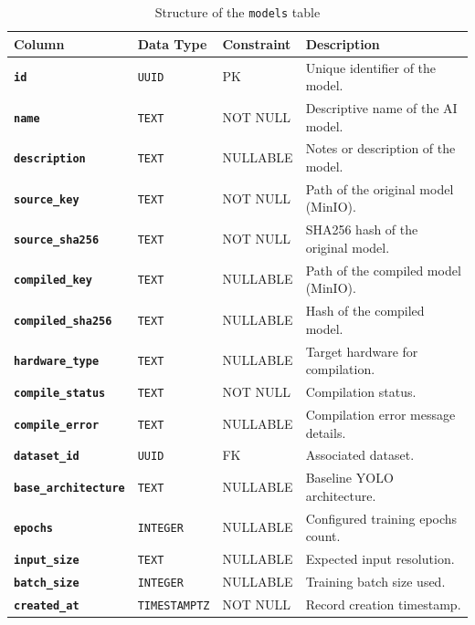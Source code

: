 \begin{table}[H]
    \centering
    \caption{Structure of the \texttt{models} table}
    \label{tab:models}
    \begin{tabular}{p{}
                    p{}
                    p{}
                    p{}}
        \hline
        \textbf{Column} & \textbf{Data Type} & \textbf{Constraint} & \textbf{Description} \\
        \hline
        \textbf{\texttt{id}} & \texttt{UUID} & \gls{PK} & Unique identifier of the model. \\
        \textbf{\texttt{name}} & \texttt{TEXT} & NOT NULL & Descriptive name of the AI model. \\
        \textbf{\texttt{description}} & \texttt{TEXT} & NULLABLE & Notes or description of the model. \\
        \textbf{\texttt{source\_key}} & \texttt{TEXT} & NOT NULL & Path of the original model (MinIO). \\
        \textbf{\texttt{source\_sha256}} & \texttt{TEXT} & NOT NULL & SHA256 hash of the original model. \\
        \textbf{\texttt{compiled\_key}} & \texttt{TEXT} & NULLABLE & Path of the compiled model (MinIO). \\
        \textbf{\texttt{compiled\_sha256}} & \texttt{TEXT} & NULLABLE & Hash of the compiled model. \\
        \textbf{\texttt{hardware\_type}} & \texttt{TEXT} & NULLABLE & Target hardware for compilation. \\
        \textbf{\texttt{compile\_status}} & \texttt{TEXT} & NOT NULL & Compilation status. \\
        \textbf{\texttt{compile\_error}} & \texttt{TEXT} & NULLABLE & Compilation error message details. \\
        \textbf{\texttt{dataset\_id}} & \texttt{UUID} & \gls{FK} & Associated dataset. \\
        \textbf{\texttt{base\_architecture}} & \texttt{TEXT} & NULLABLE & Baseline YOLO architecture. \\
        \textbf{\texttt{epochs}} & \texttt{INTEGER} & NULLABLE & Configured training epochs count. \\
        \textbf{\texttt{input\_size}} & \texttt{TEXT} & NULLABLE & Expected input resolution. \\
        \textbf{\texttt{batch\_size}} & \texttt{INTEGER} & NULLABLE & Training batch size used. \\
        \textbf{\texttt{created\_at}} & \texttt{TIMESTAMPTZ} & NOT NULL & Record creation timestamp. \\
        \hline
    \end{tabular}
\end{table}

